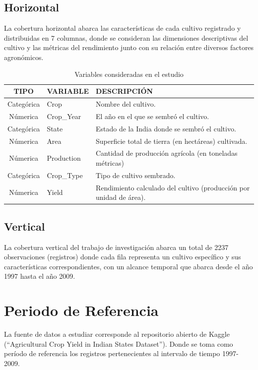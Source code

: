 \documentclass[oneside,11pt]{Latex/Classes/PhDthesisPSnPDF}
\begin{document}
\subsection{Horizontal}

La cobertura horizontal abarca las características de cada cultivo
registrado y distribuidas en 7 columnas, donde se consideran las
dimensiones descriptivas del cultivo y las métricas del rendimiento
junto con su relación entre diversos factores agronómicos.\\

\begin{table}[ht] %
\centering
\caption{Variables consideradas en el estudio} 
\resizebox{12cm}{!} {
\begin{tabular}{cll}
  \hline
  \textbf{TIPO} & \textbf{VARIABLE} & \textbf{DESCRIPCIÓN} \\ 
  \hline
  Categórica & Crop & Nombre del cultivo. \\ 
  Númerica & Crop\_Year & El año en el que se sembró el cultivo. \\ 
  Categórica & State & Estado de la India donde se sembró el cultivo. \\ 
  Númerica & Area & Superficie total de tierra (en hectáreas) cultivada. \\ 
  Númerica & Production & Cantidad de producción agrícola (en toneladas métricas) \\ 
  Categórica & Crop\_Type & Tipo de cultivo sembrado. \\ 
  Númerica & Yield & Rendimiento calculado del cultivo (producción por unidad de área). \\ 
   \hline
\end{tabular}
}
\end{table}

\subsection{Vertical}

La cobertura vertical del trabajo de investigación abarca un total de
2237 observaciones (registros) donde cada fila representa un cultivo
específico y sus características correspondientes, con un alcance
temporal que abarca desde el año 1997 hasta el año 2009.

\section{Periodo de Referencia}

La fuente de datos a estudiar corresponde al repositorio abierto de
Kaggle (``Agricultural Crop Yield in Indian States Dataset''). Donde se
toma como período de referencia los registros pertenecientes al
intervalo de tiempo 1997-2009.
\end{document}
